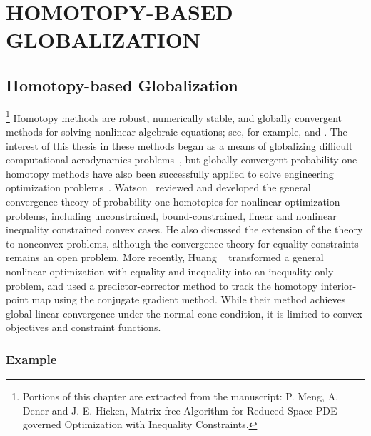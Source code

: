  
\chapter{HOMOTOPY-BASED GLOBALIZATION}\label{chap:homotopy}

\section{Homotopy-based Globalization}\label{sec:homotopy}
 \footnote{Portions of this chapter are extracted from the manuscript: P. Meng, A. Dener and J. E. Hicken, 
 Matrix-free Algorithm for Reduced-Space PDE-governed Optimization with Inequality Constraints.}
Homotopy methods are robust, numerically stable, and globally convergent methods
for solving nonlinear algebraic equations; see, for example,
\cite{allgower_georg_1993} and \cite{Watson_1989}.  The interest of this thesis in these
methods began as a means of globalizing difficult computational aerodynamics
problems~\cite{hicken:cfd2009, hicken:cfd2011b, Brown_2016}, but globally
convergent probability-one homotopy methods have also been successfully applied
to solve engineering optimization problems~\cite{WATSON1989289}.  Watson~\cite{Watson_2001} reviewed
and developed the general convergence theory of probability-one homotopies for nonlinear optimization
problems, including unconstrained, bound-constrained, linear and nonlinear
inequality constrained convex cases.  He also discussed the extension of the
theory to nonconvex problems, although the convergence theory for equality
constraints remains an open problem.  More recently, Huang
\etal~\cite{huang_2012pc} transformed a general nonlinear optimization with
equality and inequality into an inequality-only problem, and used a
predictor-corrector method to track the homotopy interior-point map using the
conjugate gradient method. While their method achieves global linear convergence
under the normal cone condition, it is limited to convex objectives and
constraint functions.

\subsection{Example}

